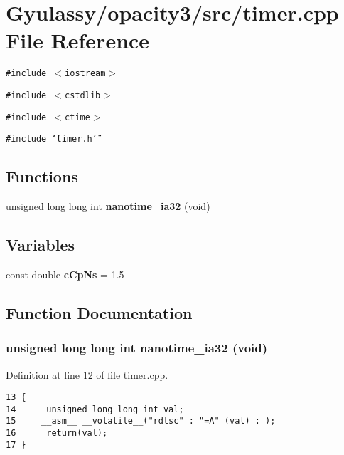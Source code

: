 \section{Gyulassy/opacity3/src/timer.cpp File Reference}
\label{timer_8cpp}
{\tt \#include $<$iostream$>$}\par
{\tt \#include $<$cstdlib$>$}\par
{\tt \#include $<$ctime$>$}\par
{\tt \#include \char`\"{}timer.h\char`\"{}}\par
\subsection*{Functions}
\begin{CompactItemize}
\item 
unsigned long long int {\bf nanotime\_\-ia32} (void)
\end{CompactItemize}
\subsection*{Variables}
\begin{CompactItemize}
\item 
const double {\bf cCpNs} = 1.5
\end{CompactItemize}


\subsection{Function Documentation}
\subsubsection{\setlength{\rightskip}{0pt plus 5cm}unsigned long long int nanotime\_\-ia32 (void)}\label{timer_8cpp_eca4efb69b4ffbab549132be3a837a8f}




Definition at line 12 of file timer.cpp.

\begin{Code}\begin{verbatim}13 {
14      unsigned long long int val;
15     __asm__ __volatile__("rdtsc" : "=A" (val) : );
16      return(val);
17 }
\end{verbatim}
\end{Code}




